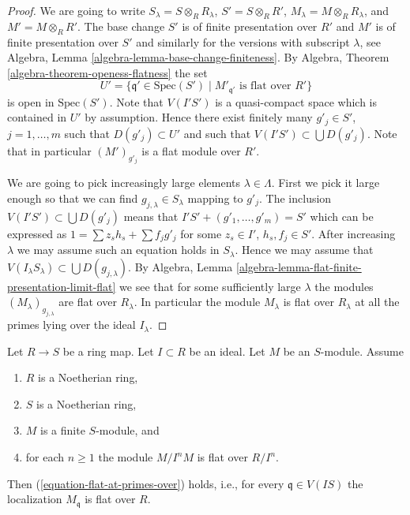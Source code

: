 \begin{proof}
We are going to write $S_\lambda = S \otimes_R R_\lambda$,
$S' = S \otimes_R R'$, $M_\lambda = M \otimes_R R_\lambda$, and
$M' = M \otimes_R R'$.
The base change $S'$ is of finite presentation over $R'$ and
$M'$ is of finite presentation over $S'$ and similarly for the
versions with subscript $\lambda$, see
Algebra, Lemma \ref{algebra-lemma-base-change-finiteness}.
By
Algebra, Theorem \ref{algebra-theorem-openess-flatness}
the set
$$
U' = \{\mathfrak q' \in \text{Spec}(S') \mid
M'_{\mathfrak q'}\text{ is flat over }R'\}
$$
is open in $\text{Spec}(S')$. Note that $V(I'S')$ is a quasi-compact space
which is contained in $U'$ by assumption. Hence there exist finitely many
$g'_j \in S'$, $j = 1, \ldots, m$ such that $D(g'_j) \subset U'$ and such
that $V(I'S') \subset \bigcup D(g'_j)$.
Note that in particular $(M')_{g'_j}$ is a flat module over $R'$.

\medskip\noindent
We are going to pick increasingly large elements $\lambda \in \Lambda$.
First we pick it large enough so that we can find
$g_{j, \lambda} \in S_{\lambda}$ mapping to $g'_j$.
The inclusion $V(I'S') \subset \bigcup D(g'_j)$ means that
$I'S' + (g'_1, \ldots, g'_m) = S'$ which can be expressed as
$1 = \sum z_sh_s + \sum f_jg'_j$ for some $z_s \in I'$, $h_s, f_j \in S'$.
After increasing $\lambda$ we may assume such an equation holds in
$S_\lambda$. Hence we may assume that
$V(I_\lambda S_\lambda) \subset \bigcup D(g_{j, \lambda})$. By
Algebra, Lemma \ref{algebra-lemma-flat-finite-presentation-limit-flat}
we see that for some sufficiently large $\lambda$ the modules
$(M_\lambda)_{g_{j, \lambda}}$ are flat over $R_\lambda$.
In particular the module $M_\lambda$ is flat over $R_\lambda$
at all the primes lying over the ideal $I_\lambda$.
\end{proof}

\begin{lemma}
\label{lemma-flat-module-powers}
Let $R \to S$ be a ring map. Let $I \subset R$ be an ideal.
Let $M$ be an $S$-module. Assume
\begin{enumerate}
\item $R$ is a Noetherian ring,
\item $S$ is a Noetherian ring,
\item $M$ is a finite $S$-module, and
\item for each $n \geq 1$ the module $M/I^n M$ is flat over
$R/I^n$.
\end{enumerate}
Then (\ref{equation-flat-at-primes-over}) holds, i.e.,
for every $\mathfrak q \in V(IS)$
the localization $M_{\mathfrak q}$ is flat over $R$.
\end{lemma}

